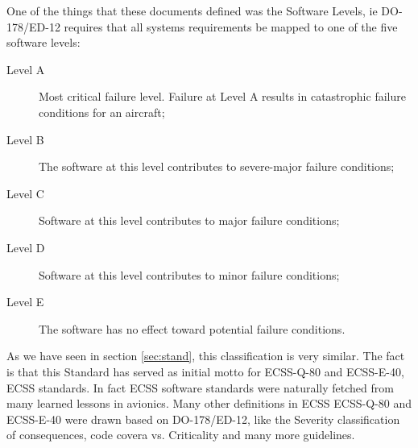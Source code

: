 {One of the things that these documents defined was the Software Levels\cite{ed-12b}, ie DO-178/ED-12 requires that all systems requirements be mapped
to one of the five software levels:
\begin{description}
\item[Level A] Most critical failure level. Failure at Level A results in catastrophic failure conditions for an aircraft;
\item[Level B] The software at this level contributes to severe-major failure conditions;
\item[Level C] Software at this level contributes to major failure conditions;
\item[Level D] Software at this level contributes to minor failure conditions;
\item[Level E] The software has no effect toward potential failure conditions.
\end{description}
As we have seen in section \ref{sec:stand}, this classification is very similar.
The fact is that this Standard has served as initial motto for ECSS-Q-80\cite{ecss-q-st-80c} and ECSS-E-40\cite{ecss-e-st-40c}, \ac{ECSS} standards.
In fact \ac{ECSS} software standards were naturally fetched from many learned lessons in avionics.
Many other definitions in \ac{ECSS} ECSS-Q-80\cite{ecss-q-st-80c} and ECSS-E-40\cite{ecss-e-st-40c} were drawn based on DO-178/ED-12, like the
Severity classification of consequences, code covera vs. Criticality and many more guidelines.

}
